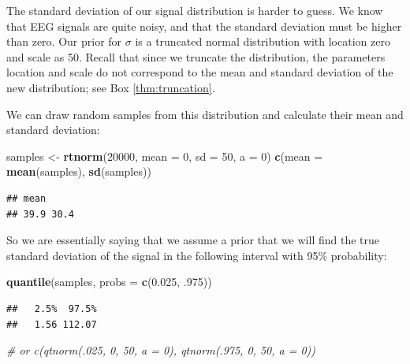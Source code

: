 \documentclass[12pt,]{krantz}
\newenvironment{Shaded}{\begin{snugshade}}{\end{snugshade}}
\newcommand{\CommentTok}[1]{\textcolor[rgb]{0.56,0.35,0.01}{\textit{#1}}}
\newcommand{\DataTypeTok}[1]{\textcolor[rgb]{0.13,0.29,0.53}{#1}}
\newcommand{\DecValTok}[1]{\textcolor[rgb]{0.00,0.00,0.81}{#1}}
\newcommand{\FloatTok}[1]{\textcolor[rgb]{0.00,0.00,0.81}{#1}}
\newcommand{\KeywordTok}[1]{\textcolor[rgb]{0.13,0.29,0.53}{\textbf{#1}}}
\newcommand{\NormalTok}[1]{#1}
\newcommand{\StringTok}[1]{\textcolor[rgb]{0.31,0.60,0.02}{#1}}
\theoremstyle{definition}
\theoremstyle{definition}
\theoremstyle{definition}
\theoremstyle{remark}
\begin{document}
The standard deviation of our signal distribution is harder to guess. We know that EEG signals are quite noisy, and that the standard deviation must be higher than zero. Our prior for \(\sigma\) is a truncated normal distribution with location zero and scale as 50. Recall that since we truncate the distribution, the parameters location and scale do not correspond to the mean and standard deviation of the new distribution; see Box \ref{thm:truncation}.

We can draw random samples from this distribution and calculate their mean and standard deviation:

\begin{Shaded}
\begin{Highlighting}[]
\NormalTok{samples <-}\StringTok{ }\KeywordTok{rtnorm}\NormalTok{(}\DecValTok{20000}\NormalTok{, }\DataTypeTok{mean =} \DecValTok{0}\NormalTok{, }\DataTypeTok{sd =} \DecValTok{50}\NormalTok{, }\DataTypeTok{a =} \DecValTok{0}\NormalTok{)}
\KeywordTok{c}\NormalTok{(}\DataTypeTok{mean =} \KeywordTok{mean}\NormalTok{(samples), }\KeywordTok{sd}\NormalTok{(samples))}
\end{Highlighting}
\end{Shaded}

\begin{verbatim}
## mean      
## 39.9 30.4
\end{verbatim}

So we are essentially saying that we assume a prior that we will find the true standard deviation of the signal in the following interval with 95\% probability:

\begin{Shaded}
\begin{Highlighting}[]
\KeywordTok{quantile}\NormalTok{(samples, }\DataTypeTok{probs =} \KeywordTok{c}\NormalTok{(}\FloatTok{0.025}\NormalTok{, }\FloatTok{.975}\NormalTok{))}
\end{Highlighting}
\end{Shaded}

\begin{verbatim}
##   2.5%  97.5% 
##   1.56 112.07
\end{verbatim}

\begin{Shaded}
\begin{Highlighting}[]
\CommentTok{# or c(qtnorm(.025, 0, 50, a = 0), qtnorm(.975, 0, 50, a = 0))}
\end{Highlighting}
\end{Shaded}
\end{document}
